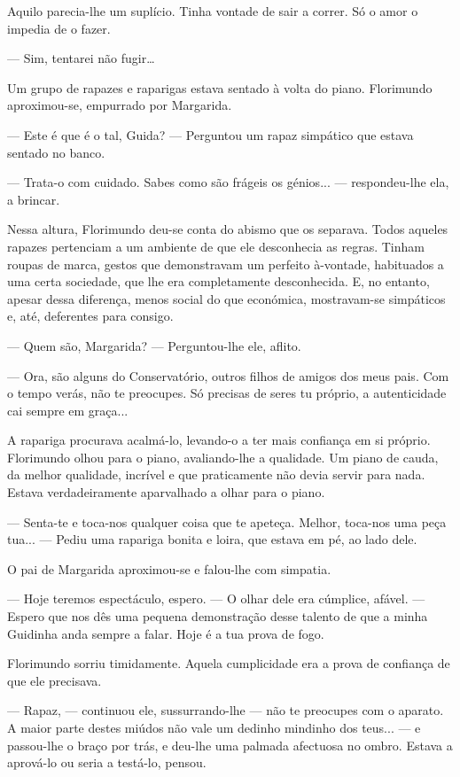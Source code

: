 Aquilo parecia-lhe um suplício. Tinha vontade de sair a correr. Só o
amor o impedia de o fazer.

--- Sim, tentarei não fugir\ldots{}

Um grupo de rapazes e raparigas estava sentado à volta do piano.
Florimundo aproximou-se, empurrado por Margarida.

--- Este é que é o tal, Guida? --- Perguntou um rapaz simpático que estava
sentado no banco.

--- Trata-o com cuidado. Sabes como são frágeis os génios... ---
respondeu-lhe ela, a brincar.

Nessa altura, Florimundo deu-se conta do abismo que os separava. Todos
aqueles rapazes pertenciam a um ambiente de que ele desconhecia as
regras. Tinham roupas de marca, gestos que demonstravam um perfeito
à-vontade, habituados a uma certa sociedade, que lhe era completamente
desconhecida. E, no entanto, apesar dessa diferença, menos social do que
económica, mostravam-se simpáticos e, até, deferentes para consigo.

--- Quem são, Margarida? --- Perguntou-lhe ele, aflito.

--- Ora, são alguns do Conservatório, outros filhos de amigos dos meus
pais. Com o tempo verás, não te preocupes. Só precisas de seres tu
próprio, a autenticidade cai sempre em graça...

A rapariga procurava acalmá-lo, levando-o a ter mais confiança em si
próprio. Florimundo olhou para o piano, avaliando-lhe a qualidade. Um
piano de cauda, da melhor qualidade, incrível e que praticamente não
devia servir para nada. Estava verdadeiramente aparvalhado a olhar para
o piano.

--- Senta-te e toca-nos qualquer coisa que te apeteça. Melhor, toca-nos
uma peça tua... --- Pediu uma rapariga bonita e loira, que estava em pé,
ao lado dele.

O pai de Margarida aproximou-se e falou-lhe com simpatia.

--- Hoje teremos espectáculo, espero. --- O olhar dele era cúmplice, afável.
--- Espero que nos dês uma pequena demonstração desse talento de que a
minha Guidinha anda sempre a falar. Hoje é a tua prova de fogo.

Florimundo sorriu timidamente. Aquela cumplicidade era a prova de
confiança de que ele precisava.

--- Rapaz, --- continuou ele, sussurrando-lhe --- não te preocupes com o
aparato. A maior parte destes miúdos não vale um dedinho mindinho dos
teus... --- e passou-lhe o braço por trás, e deu-lhe uma palmada afectuosa
no ombro. Estava a aprová-lo ou seria a testá-lo, pensou.

